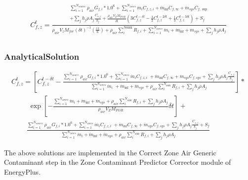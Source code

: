 \begin{equation}
\begin{array}{l}C_{f,z}^t = \frac{\begin{array}{l}\sum\limits_{i = 1}^{{N_{source}}} {{\rho_{air}}{G_{f,i}}*{{1.0}^6}}  + \sum\limits_{i = 1}^{{N_{zones}}} {{{\dot m}_i}{C_{f,z,i}}}  + {{\dot m}_{\inf }}{C_{f,\infty }} + {{\dot m}_{sys}}{C_{f,\sup }}\\ + \sum\limits_j {{h_j}\rho {A_j}\frac{{{C_{s,j}}}}{{{k_j}}} + \frac{{{\rho_{air}}{V_Z}{M_{FOR}}}}{{\delta t}}(3C_{f,z}^{t - \delta t} - \frac{3}{2}C_{f,z}^{t - 2\delta t} + \frac{1}{3}C_{f,z}^{t - 3\delta t}) + {S_f}} \end{array}}{{{\rho_{air}}{V_z}{M_{for}}{{\left( {\delta t} \right)}^{ - 1}}\left( {\frac{{11}}{6}} \right) + {\rho_{air}}\sum\limits_i^{N{\mathrm{sink}}} {{R_{f,i}}}  + \sum\limits_{i = 1}^{{N_{zones}}} {{{\dot m}_i}}  + {{\dot m}_{\inf }} + {{\dot m}_{sys}} + \sum\limits_j {{h_j}\rho {A_j}} }}\\\end{array}
\end{equation}

\subsubsection{AnalyticalSolution}\label{analyticalsolution-1-000}

\begin{equation}
\begin{array}{l}C_{f,z}^t = \left[ {C_{f,z}^{t - \delta t} - \frac{{\sum\limits_{i = 1}^{{N_{source}}} {{\rho_{air}}{G_{f,i}}*{{1.0}^6}}  + \sum\limits_{i = 1}^{{N_{zones}}} {{{\dot m}_i}} {C_{f,z,i}}\; + {{\dot m}_{\inf }}{C_{f,\infty }} + {{\dot m}_{sys}}{C_{f,sys}} + \sum\limits_j {{h_j}\rho {A_j}} \frac{{{C_{s,j}}}}{{{k_j}}}}}{{\sum\limits_{i = 1}^{{N_{zones}}} {{{\dot m}_i}} \; + {{\dot m}_{\inf }} + {{\dot m}_{sys}} + {\rho_{air}}\sum\limits_i^{{N_{{\mathrm{sink}}}}} {{R_{f,i}} + \sum\limits_j {{h_j}\rho {A_j}} } }}} \right]*\\\;\;\;\;\;\;\;\;\;\exp \left[ { - \frac{{\sum\limits_{i = 1}^{{N_{zones}}} {{{\dot m}_i}}  + {{\dot m}_{\inf }} + {{\dot m}_{sys}} + {\rho_{air}}\sum\limits_i^{{N_{{\mathrm{sink}}}}} {{R_{f,i}} + \sum\limits_j {{h_j}\rho {A_j}} } }}{{{\rho_{air}}{V_Z}{M_{FOR}}}}\delta t} \right] + \\\;\;\;\;\;\;\;\;\frac{{\sum\limits_{i = 1}^{{N_{source}}} {{\rho_{air}}{G_{f,i}}*{{1.0}^6}}  + \sum\limits_{i = 1}^{{N_{zones}}} {{{\dot m}_i}} {C_{f,z,i}}\; + {{\dot m}_{\inf }}{C_{f,\infty }} + {{\dot m}_{sys}}{C_{f,sys}} + \sum\limits_j {{h_j}\rho {A_j}} \frac{{{C_{s,j}}}}{{{k_j}}} + {S_f}}}{{\sum\limits_{i = 1}^{{N_{zones}}} {{{\dot m}_i}}  + {{\dot m}_{\inf }} + {{\dot m}_{sys}} + {\rho_{air}}\sum\limits_i^{{N_{{\mathrm{sink}}}}} {{R_{f,i}} + \sum\limits_j {{h_j}\rho {A_j}} } }}\end{array}
\end{equation}

The above solutions are implemented in the Correct Zone Air Generic Contaminant step in the Zone Contaminant Predictor Corrector module of EnergyPlus.
